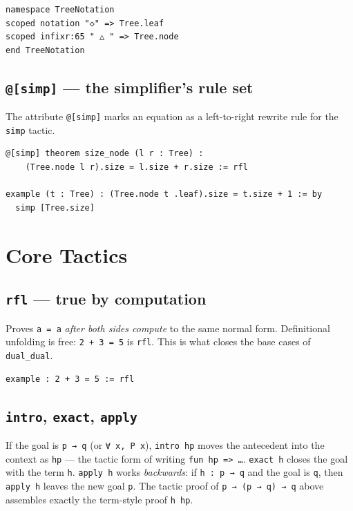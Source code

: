 \documentclass[11pt, a4paper, oneside]{book}
\newcommand{\lc}[1]{\texttt{#1}}
\begin{document}
\begin{leanbox}
\begin{verbatim}
namespace TreeNotation
scoped notation "◇" => Tree.leaf
scoped infixr:65 " △ " => Tree.node
end TreeNotation
\end{verbatim}
\end{leanbox}

\subsection*{\lc{@[simp]} --- the simplifier's rule set}

The attribute \lc{@[simp]} marks an equation as a left-to-right rewrite rule
for the \lc{simp} tactic.

\begin{leanbox}
\begin{verbatim}
@[simp] theorem size_node (l r : Tree) :
    (Tree.node l r).size = l.size + r.size := rfl

example (t : Tree) : (Tree.node t .leaf).size = t.size + 1 := by
  simp [Tree.size]
\end{verbatim}
\end{leanbox}

\section*{Core Tactics}

\subsection*{\lc{rfl} --- true by computation}

Proves \lc{a = a} \emph{after both sides compute} to the same normal form.
Definitional unfolding is free: \lc{2 + 3 = 5} is \lc{rfl}. This is what closes
the base cases of \lc{dual\_dual}.

\begin{leanbox}
\begin{verbatim}
example : 2 + 3 = 5 := rfl
\end{verbatim}
\end{leanbox}

\subsection*{\lc{intro}, \lc{exact}, \lc{apply}}

If the goal is \lc{p → q} (or \lc{∀ x, P x}), \lc{intro hp} moves the antecedent
into the context as \lc{hp} --- the tactic form of writing \lc{fun hp => …}.
\lc{exact h} closes the goal with the term \lc{h}. \lc{apply h} works
\emph{backwards}: if \lc{h : p → q} and the goal is \lc{q}, then \lc{apply h}
leaves the new goal \lc{p}. The tactic proof of \lc{p → (p → q) → q} above
assembles exactly the term-style proof \lc{h hp}.
\end{document}
